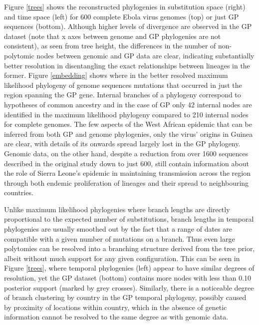 \documentclass[11pt,oneside,letterpaper]{article}
\begin{document}
Figure \ref{trees} shows the reconstructed phylogenies in substitution space (right) and time space (left) for 600 complete Ebola virus genomes (top) or just GP sequences (bottom).
Although higher levels of divergence are observed in the GP dataset (note that x axes between genome and GP phylogenies are not consistent), as seen from tree height, the differences in the number of non-polytomic nodes between genomic and GP data are clear, indicating substantially better resolution in disentangling the exact relationships between lineages in the former.
Figure \ref{embedding} shows where in the better resolved maximum likelihood phylogeny of genome sequences mutations that occurred in just the region spanning the GP gene.
Internal branches of a phylogeny correspond to hypotheses of common ancestry and in the case of GP only 42 internal nodes are identified in the maximum likelihood phylogeny compared to 210 internal nodes for complete genomes.
The few aspects of the West African epidemic that can be inferred from both GP and genome phylogenies, only the virus' origins in Guinea are clear, with details of its onwards spread largely lost in the GP phylogeny.
Genomic data, on the other hand, despite a reduction from over 1600 sequences described in the original study \citep{dudas_virus_2017} down to just 600, still contain information about the role of Sierra Leone's epidemic in maintaining transmission across the region through both endemic proliferation of lineages and their spread to neighbouring countries.

Unlike maximum likelihood phylogenies where branch lengths are directly proportional to the expected number of substitutions, branch lengths in temporal phylogenies are usually smoothed out by the fact that a range of dates are compatible with a given number of mutations on a branch.
Thus even large polytomies can be resolved into a branching structure derived from the tree prior, albeit without much support for any given configuration.
This can be seen in Figure \ref{trees}, where temporal phylogenies (left) appear to have similar degrees of resolution, yet the GP dataset (bottom) contains more nodes with less than 0.10 posterior support (marked by grey crosses).
Similarly, there is a noticeable degree of branch clustering by country in the GP temporal phylogeny, possibly caused by proximity of locations within country, which in the absence of genetic information cannot be resolved to the same degree as with genomic data.
\end{document}
